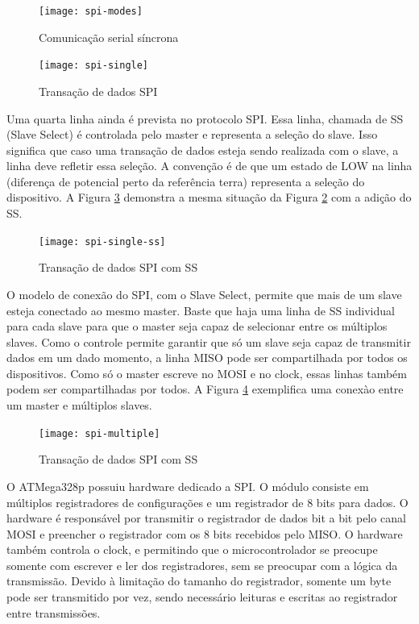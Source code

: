 \documentclass[11pt]{article}
\begin{document}
\begin{figure}
    \centering
    \texttt{[image: spi-modes]}
    \caption{Comunicação serial síncrona}
    \label{figspimodes}
\end{figure}
\begin{figure}
    \centering
    \texttt{[image: spi-single]}
    \caption{Transação de dados SPI}
    \label{figspisingle}
\end{figure}
\par Uma quarta linha ainda é prevista no protocolo SPI. Essa linha, chamada de SS (Slave Select) é controlada pelo master e representa a seleção do slave. Isso significa que caso uma transação de dados esteja sendo realizada com o slave, a linha deve refletir essa seleção. A convenção é de que um estado de LOW na linha (diferença de potencial perto da referência terra) representa a seleção do dispositivo. A Figura \ref{figspisingless} demonstra a mesma situação da Figura \ref{figspisingle} com a adição do SS.
\begin{figure}
    \centering
    \texttt{[image: spi-single-ss]}
    \caption{Transação de dados SPI com SS}
    \label{figspisingless}
\end{figure}
\par O modelo de conexão do SPI, com o Slave Select, permite que mais de um slave esteja conectado ao mesmo master. Baste que haja uma linha de SS individual para cada slave para que o master seja capaz de selecionar entre os múltiplos slaves. Como o controle permite garantir que só um slave seja capaz de transmitir dados em um dado momento, a linha MISO pode ser compartilhada por todos os dispositivos. Como só o master escreve no MOSI e no clock, essas linhas também podem ser compartilhadas por todos. A Figura \ref{figspimultiple} exemplifica uma conexào entre um master e múltiplos slaves.
\begin{figure}
    \centering
    \texttt{[image: spi-multiple]}
    \caption{Transação de dados SPI com SS}
    \label{figspimultiple}
\end{figure}
\par O ATMega328p possuiu hardware dedicado a SPI. O módulo consiste em múltiplos registradores de configurações e um registrador de 8 bits para dados. O hardware é responsável por transmitir o registrador de dados bit a bit pelo canal MOSI e preencher o registrador com os 8 bits recebidos pelo MISO. O hardware também controla o clock, e permitindo que o microcontrolador se preocupe somente com escrever e ler dos registradores, sem se preocupar com a lógica da transmissão. Devido à limitação do tamanho do registrador, somente um byte pode ser transmitido por vez, sendo necessário leituras e escritas ao registrador entre transmissões.
\end{document}
